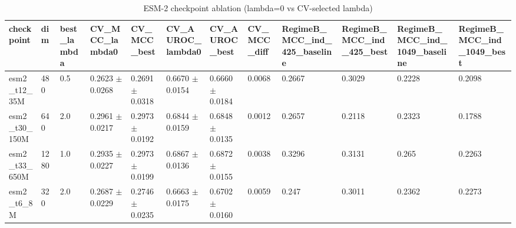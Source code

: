 \begin{table}[ht]
\centering\small
\caption{ESM-2 checkpoint ablation (lambda=0 vs CV-selected lambda)}
\label{tab:T5_5_checkpoint_ablation}
\begin{tabular}{llllllllllll}
\hline
checkpoint & dim & best\_lambda & CV\_MCC\_lambda0 & CV\_MCC\_best & CV\_AUROC\_lambda0 & CV\_AUROC\_best & CV\_MCC\_diff & RegimeB\_MCC\_ind\_425\_baseline & RegimeB\_MCC\_ind\_425\_best & RegimeB\_MCC\_ind\_1049\_baseline & RegimeB\_MCC\_ind\_1049\_best \\
\hline
esm2\_t12\_35M & 480 & 0.5 & 0.2623 $\pm$ 0.0268 & 0.2691 $\pm$ 0.0318 & 0.6670 $\pm$ 0.0154 & 0.6660 $\pm$ 0.0184 & 0.0068 & 0.2667 & 0.3029 & 0.2228 & 0.2098 \\
esm2\_t30\_150M & 640 & 2.0 & 0.2961 $\pm$ 0.0217 & 0.2973 $\pm$ 0.0192 & 0.6844 $\pm$ 0.0159 & 0.6848 $\pm$ 0.0135 & 0.0012 & 0.2657 & 0.2118 & 0.2323 & 0.1788 \\
esm2\_t33\_650M & 1280 & 1.0 & 0.2935 $\pm$ 0.0227 & 0.2973 $\pm$ 0.0199 & 0.6867 $\pm$ 0.0136 & 0.6872 $\pm$ 0.0155 & 0.0038 & 0.3296 & 0.3131 & 0.265 & 0.2263 \\
esm2\_t6\_8M & 320 & 2.0 & 0.2687 $\pm$ 0.0229 & 0.2746 $\pm$ 0.0235 & 0.6663 $\pm$ 0.0175 & 0.6702 $\pm$ 0.0160 & 0.0059 & 0.247 & 0.3011 & 0.2362 & 0.2273 \\
\hline
\end{tabular}
\end{table}
